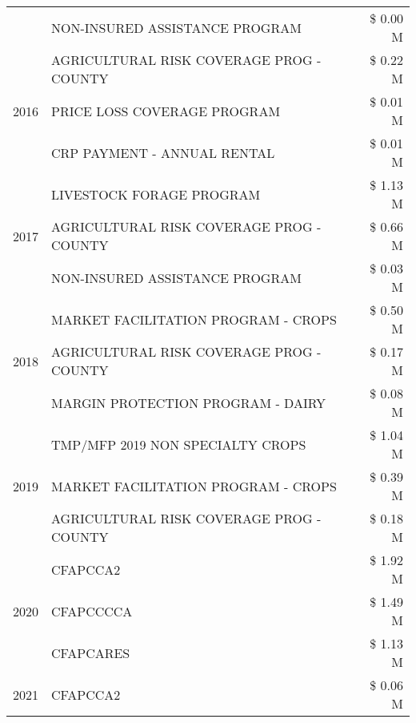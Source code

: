 \begin{tabular}{llr}
 & NON-INSURED ASSISTANCE PROGRAM & \$ 0.00 M \\
\cline{1-3}
\multirow[t]{3}{*}{2016} & AGRICULTURAL RISK COVERAGE PROG - COUNTY & \$ 0.22 M \\
 & PRICE LOSS COVERAGE PROGRAM & \$ 0.01 M \\
 & CRP PAYMENT - ANNUAL RENTAL & \$ 0.01 M \\
\cline{1-3}
\multirow[t]{3}{*}{2017} & LIVESTOCK FORAGE PROGRAM & \$ 1.13 M \\
 & AGRICULTURAL RISK COVERAGE PROG - COUNTY & \$ 0.66 M \\
 & NON-INSURED ASSISTANCE PROGRAM & \$ 0.03 M \\
\cline{1-3}
\multirow[t]{3}{*}{2018} & MARKET FACILITATION PROGRAM - CROPS & \$ 0.50 M \\
 & AGRICULTURAL RISK COVERAGE PROG - COUNTY & \$ 0.17 M \\
 & MARGIN PROTECTION PROGRAM - DAIRY & \$ 0.08 M \\
\cline{1-3}
\multirow[t]{3}{*}{2019} & TMP/MFP 2019 NON SPECIALTY CROPS & \$ 1.04 M \\
 & MARKET FACILITATION PROGRAM - CROPS & \$ 0.39 M \\
 & AGRICULTURAL RISK COVERAGE PROG - COUNTY & \$ 0.18 M \\
\cline{1-3}
\multirow[t]{3}{*}{2020} & CFAPCCA2 & \$ 1.92 M \\
 & CFAPCCCCA & \$ 1.49 M \\
 & CFAPCARES & \$ 1.13 M \\
\cline{1-3}
2021 & CFAPCCA2 & \$ 0.06 M \\
\cline{1-3}
\bottomrule
\end{tabular}
